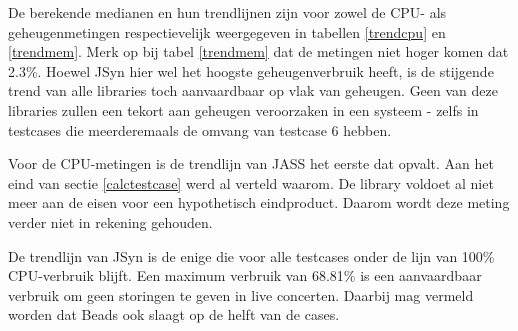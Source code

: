 De berekende medianen en hun trendlijnen zijn voor zowel de CPU- als geheugenmetingen respectievelijk weergegeven in tabellen \ref{trendcpu} en \ref{trendmem}. Merk op bij tabel \ref{trendmem} dat de metingen niet hoger komen dat 2.3\%. Hoewel JSyn hier wel het hoogste geheugenverbruik heeft, is de stijgende trend van alle libraries toch aanvaardbaar op vlak van geheugen. Geen van deze libraries zullen een tekort aan geheugen veroorzaken in een systeem - zelfs in testcases die meerderemaals de omvang van testcase 6 hebben.

Voor de CPU-metingen is de trendlijn van JASS het eerste dat opvalt. Aan het eind van sectie \ref{calctestcase} werd al verteld waarom. De library voldoet al niet meer aan de eisen voor een hypothetisch eindproduct. Daarom wordt deze meting verder niet in rekening gehouden.

De trendlijn van JSyn is de enige die voor alle testcases onder de lijn van 100\% CPU-verbruik blijft. Een maximum verbruik van 68.81\% is een aanvaardbaar verbruik om geen storingen te geven in live concerten. Daarbij mag vermeld worden dat Beads ook slaagt op de helft van de cases.

